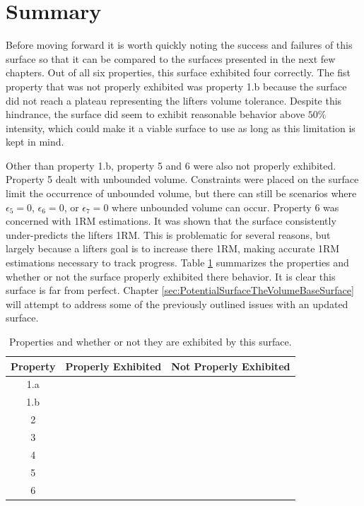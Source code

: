 \section{Summary}

Before moving forward it is worth quickly noting the success and failures of this surface so that it can be compared to the surfaces presented in the next few chapters. Out of all six properties, this surface exhibited four correctly. The fist property that was not properly exhibited was property 1.b because the surface did not reach a plateau representing the lifters volume tolerance. Despite this hindrance, the surface did seem to exhibit reasonable behavior above $50\%$ intensity, which could make it a viable surface to use as long as this limitation is kept in mind.

Other than property 1.b, property 5 and 6 were also not properly exhibited. Property 5 dealt with unbounded volume. Constraints were placed on the surface limit the occurrence of unbounded volume, but there can still be scenarios where $\epsilon_5=0$, $\epsilon_6=0$, or $\epsilon_7=0$ where unbounded volume can occur. Property 6 was concerned with 1RM estimations. It was shown that the surface consistently under-predicts the lifters 1RM. This is problematic for several reasons, but largely because a lifters goal is to increase there 1RM, making accurate 1RM estimations necessary to track progress. Table \ref{tab:BasicSurfacePropertiesAndBehaviorsSummary} summarizes the properties and whether or not the surface properly exhibited there behavior. It is clear this surface is far from perfect. Chapter \ref{sec:PotentialSurfaceTheVolumeBaseSurface} will attempt to address some of the previously outlined issues with an updated surface.

\begin{table}[htb]
    \centering
    \begin{tabular}{|c|c|c|}
    		\hline
    		Property & Properly Exhibited & Not Properly Exhibited \\
    		\hline
    		1.a & \cmark & \\
    		1.b & & \xmark \\  		
    		2 & \cmark & \\
    		3 & \cmark & \\
    		4 & \cmark & \\
    		5 & & \xmark \\
    		6 & & \xmark \\
    		\hline
    \end{tabular}
    \caption{Properties and whether or not they are exhibited by this surface.}
    \label{tab:BasicSurfacePropertiesAndBehaviorsSummary}
\end{table}



